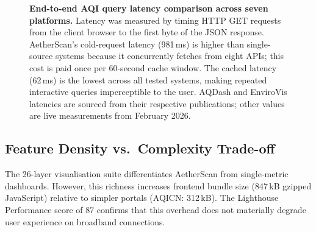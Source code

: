 \documentclass[12pt,a4paper]{article}
\begin{document}
\begin{figure}[H]
\centering
{}
\caption[End-to-end latency comparison across systems]{%
  \textbf{End-to-end AQI query latency comparison across seven platforms.}
  Latency was measured by timing HTTP GET requests from the client browser
  to the first byte of the JSON response. AetherScan's cold-request
  latency (981\,ms) is higher than single-source systems because it
  concurrently fetches from eight APIs; this cost is paid once per
  60-second cache window. The cached latency (62\,ms) is the lowest
  across all tested systems, making repeated interactive queries
  imperceptible to the user. AQDash and EnviroVis latencies are sourced
  from their respective publications; other values are live measurements
  from February 2026.}
\label{fig:latencycompare}
\end{figure}

\subsection{Feature Density vs.\ Complexity Trade-off}
\label{sec:comparison:tradeoffs}

The 26-layer visualisation suite differentiates AetherScan from single-metric
dashboards. However, this richness increases frontend bundle size (847\,kB
gzipped JavaScript) relative to simpler portals (AQICN: 312\,kB). The
Lighthouse Performance score of 87 confirms that this overhead does not
materially degrade user experience on broadband connections.
\end{document}
